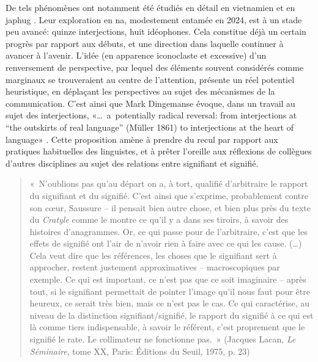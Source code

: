 De tels phénomènes ont notamment été étudiés en détail en vietnamien \parencite{brunelleetal2014} et en japhug \parencite{jacques2013c}. Leur exploration en na, modestement entamée en 2024, est à un stade peu avancé: quinze interjections, huit idéophones. Cela constitue déjà un certain progrès par rapport aux débuts, et une direction dans laquelle continuer à avancer à l'avenir. L'idée (en apparence iconoclaste et excessive) d'un renversement de perspective, par lequel des éléments souvent considérés comme marginaux se trouveraient au centre de l'attention, présente un réel potentiel heuristique, en déplaçant les perspectives au sujet des mécanismes de la communication. C'est ainsi que Mark Dingemanse évoque, dans un travail au sujet des interjections, «{\dots}~a~potentially
radical reversal: from interjections at “the outskirts of real language” (Müller 1861) to interjections at the heart of language» \parencite[258]{dingemanse_interjections_2024}. Cette proposition amène à prendre du recul par rapport aux pratiques habituelles des linguistes, et à prêter l'oreille aux réflexions de collègues d'autres disciplines au sujet des relations entre signifiant et signifié.

\begin{quote}
« N'oublions pas qu'au départ on a, à tort, qualifié d'arbitraire le rapport du signifiant et du signifié. C'est ainsi que s'exprime, probablement contre son cœur, Saussure -- il pensait bien autre chose, et bien plus près du texte du \emph{Cratyle} comme le montre ce qu'il y a dans ses tiroirs, à savoir des histoires d'anagrammes. Or, ce qui passe pour de l'arbitraire, c'est que les effets de signifié ont l'air de n'avoir rien à faire avec ce qui les cause.
(…) Cela veut dire que les références, les choses que le signifiant sert à approcher, restent justement approximatives -- macroscopiques par exemple. Ce qui est important, ce n'est pas que ce soit imaginaire -- après tout, si le signifiant permettait de pointer l'image qu'il nous faut pour être heureux, ce serait très bien, mais ce n'est pas le cas. Ce qui caractérise, au niveau de la distinction signifiant/signifié, le rapport du signifié à ce qui est là comme tiers indispensable, à savoir le référent, c'est proprement que le signifié le rate. Le collimateur ne fonctionne pas. » (Jacques Lacan, \emph{Le Séminaire}, tome XX, Paris: Éditions du Seuil, 1975, p. 23)
\end{quote}

